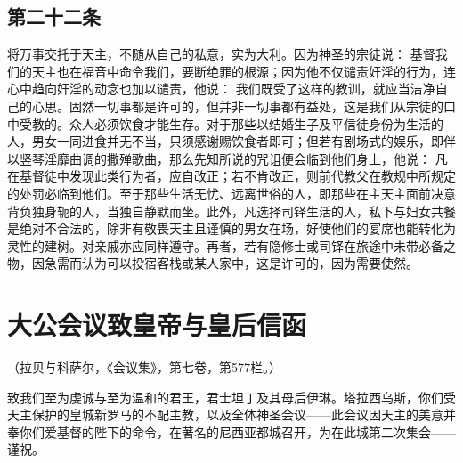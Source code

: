 
\subsection{第二十二条}

\par

将万事交托于天主，不随从自己的私意，实为大利。因为神圣的宗徒说： 基督我们的天主也在福音中命令我们，要断绝罪的根源；因为他不仅谴责奸淫的行为，连心中趋向奸淫的动念也加以谴责，他说： 我们既受了这样的教训，就应当洁净自己的心思。固然一切事都是许可的，但并非一切事都有益处，这是我们从宗徒的口中受教的。众人必须饮食才能生存。对于那些以结婚生子及平信徒身份为生活的人，男女一同进食并无不当，只须感谢赐饮食者即可；但若有剧场式的娱乐，即伴以竖琴淫靡曲调的撒殚歌曲，那么先知所说的咒诅便会临到他们身上，他说： 凡在基督徒中发现此类行为者，应自改正；若不肯改正，则前代教父在教规中所规定的处罚必临到他们。至于那些生活无忧、远离世俗的人，即那些在主天主面前决意背负独身轭的人，当独自静默而坐。此外，凡选择司铎生活的人，私下与妇女共餐是绝对不合法的，除非有敬畏天主且谨慎的男女在场，好使他们的宴席也能转化为灵性的建树。对亲戚亦应同样遵守。再者，若有隐修士或司铎在旅途中未带必备之物，因急需而认为可以投宿客栈或某人家中，这是许可的，因为需要使然。\par

\par


\section{大公会议致皇帝与皇后信函}

（拉贝与科萨尔，《会议集》，第七卷，第577栏。）\par

致我们至为虔诚与至为温和的君王，君士坦丁及其母后伊琳。塔拉西乌斯，你们受天主保护的皇城新罗马的不配主教，以及全体神圣会议——此会议因天主的美意并奉你们爱基督的陛下的命令，在著名的尼西亚都城召开，为在此城第二次集会——谨祝。\par

